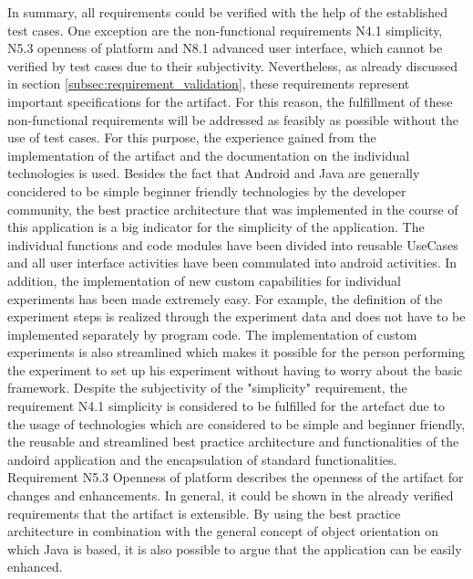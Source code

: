 In summary, all requirements could be verified with the help of the established test cases. One exception are the non-functional requirements N4.1 simplicity, N5.3 openness of platform and N8.1 advanced user interface, which cannot be verified by test cases due to their subjectivity. Nevertheless, as already discussed in section \ref{subsec:requirement_validation}, these requirements represent important specifications for the artifact. For this reason, the fulfillment of these non-functional requirements will be addressed as feasibly as possible without the use of test cases. For this purpose, the experience gained from the implementation of the artifact and the documentation on the individual technologies is used. Besides the fact that Android and Java are generally concidered to be simple beginner friendly technologies by the developer community, the best practice architecture that was implemented in the course of this application is a big indicator for the simplicity of the application. The individual functions and code modules have been divided into reusable UseCases and all user interface activities have been commulated into android activities. In addition, the implementation of new custom capabilities for individual experiments has been made extremely easy. For example, the definition of the experiment steps is realized through the experiment data and does not have to be implemented separately by program code. The implementation of custom experiments is also streamlined which makes it possible for the person performing the experiment to set up his experiment without having to worry about the basic framework. Despite the subjectivity of the "simplicity" requirement, the requirement N4.1 simplicity is considered to be fulfilled for the artefact due to the usage of technologies which are considered to be simple and beginner friendly, the reusable and streamlined best practice architecture and functionalities of the andoird application and the encapsulation of standard functionalities. 
Requirement N5.3 Openness of platform describes the openness of the artifact for changes and enhancements. In general, it could be shown in the already verified requirements that the artifact is extensible. By using the best practice architecture in combination with the general concept of object orientation on which Java is based, it is also possible to argue that the application can be easily enhanced.
